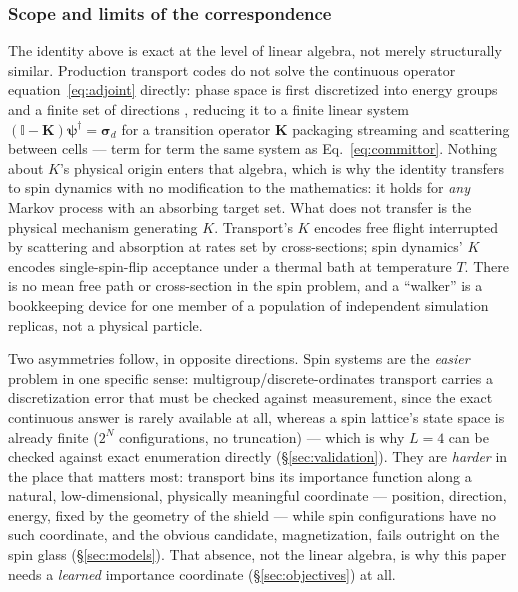 \documentclass[a4paper,fleqn]{cas-sc}
\newcommand{\dg}{^{\dagger}}
\begin{document}
	\subsubsection{Scope and limits of the correspondence}\label{sec:scope}
	The identity above is exact at the level of linear algebra, not merely structurally
	similar. Production transport codes do not solve the continuous operator
	equation~\eqref{eq:adjoint} directly: phase space is first discretized into energy groups
	and a finite set of directions \cite{wagner1998, lewins1965}, reducing it to a finite
	linear system $(\mathbb I-\mathbf K)\boldsymbol\psi\dg=\boldsymbol\sigma_d$ for a
	transition operator $\mathbf K$ packaging streaming and scattering between cells --- term
	for term the same system as Eq.~\eqref{eq:committor}. Nothing about $K$'s physical origin
	enters that algebra, which is why the identity transfers to spin dynamics with no
	modification to the mathematics: it holds for \emph{any} Markov process with an absorbing
	target set. What does not transfer is the physical mechanism generating $K$. Transport's
	$K$ encodes free flight interrupted by scattering and absorption at rates set by
	cross-sections; spin dynamics' $K$ encodes single-spin-flip acceptance under a thermal bath
	at temperature $T$. There is no mean free path or cross-section in the spin problem, and a
	``walker'' is a bookkeeping device for one member of a population of independent simulation
	replicas, not a physical particle.
	
	Two asymmetries follow, in opposite directions. Spin systems are the \emph{easier} problem
	in one specific sense: multigroup/discrete-ordinates transport carries a discretization
	error that must be checked against measurement, since the exact continuous answer is rarely
	available at all, whereas a spin lattice's state space is already finite ($2^N$
	configurations, no truncation) --- which is why $L=4$ can be checked against exact
	enumeration directly (\S\ref{sec:validation}). They are \emph{harder} in the place that matters
	most: transport bins its importance function along a natural, low-dimensional,
	physically meaningful coordinate --- position, direction, energy, fixed by the geometry of
	the shield --- while spin configurations have no such coordinate, and the obvious candidate,
	magnetization, fails outright on the spin glass (\S\ref{sec:models}). That absence, not the
	linear algebra, is why this paper needs a \emph{learned} importance coordinate
	(\S\ref{sec:objectives}) at all.
	
	\FloatBarrier
	
\end{document}
